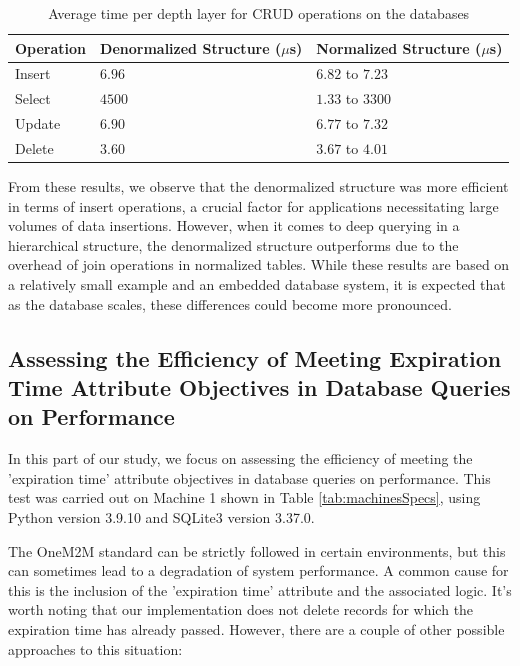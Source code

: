 \documentclass[a4paper,fleqn]{cas-dc}
\begin{document}
\begin{table}[h]
\scriptsize
\centering
\caption{Average time per depth layer for CRUD operations on the databases}
\label{tab:DBComparisonResults}
\begin{tabular}{ p{1cm} p{3cm} p{3cm} }
\hline
\textbf{Operation} & \textbf{Denormalized Structure ($\mu$s)} & \textbf{Normalized Structure ($\mu$s)} \\
\hline \hline
Insert & $6.96$ & $6.82$ to $7.23$ \\
Select & $4500$ & $1.33$ to $3300$ \\
Update & $6.90$ & $6.77$ to $7.32$ \\
Delete & $3.60$ & $3.67$ to $4.01$ \\
\hline
\end{tabular}
\end{table}

From these results, we observe that the denormalized structure was more efficient in terms of insert operations, a crucial factor for applications necessitating large volumes of data insertions. However, when it comes to deep querying in a hierarchical structure, the denormalized structure outperforms due to the overhead of join operations in normalized tables. While these results are based on a relatively small example and an embedded database system, it is expected that as the database scales, these differences could become more pronounced.

\subsection{Assessing the Efficiency of Meeting Expiration Time Attribute Objectives in Database Queries on Performance}

In this part of our study, we focus on assessing the efficiency of meeting the 'expiration time' attribute objectives in database queries on performance. This test was carried out on Machine 1 shown in Table \ref{tab:machinesSpecs}, using Python version 3.9.10 and SQLite3 version 3.37.0.

The OneM2M standard can be strictly followed in certain environments, but this can sometimes lead to a degradation of system performance. A common cause for this is the inclusion of the 'expiration time' attribute and the associated logic. It's worth noting that our implementation does not delete records for which the expiration time has already passed. However, there are a couple of other possible approaches to this situation:
\end{document}
